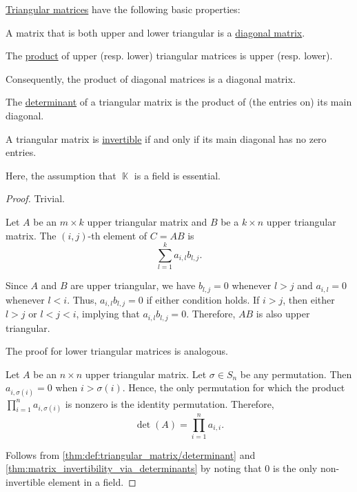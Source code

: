 \begin{proposition}\label{thm:def:triangular_matrix}
  \hyperref[def:triangular_matrix]{Triangular matrices} have the following basic properties:
  \begin{thmenum}
     A matrix that is both upper and lower triangular is a \hyperref[def:matrix_diagonal]{diagonal matrix}.

     The \hyperref[thm:matrix_algebra/matrix_multiplication]{product} of upper (resp. lower) triangular matrices is upper (resp. lower).

    Consequently, the product of diagonal matrices is a diagonal matrix.

     The \hyperref[thm:def:triangular_matrix/determinant]{determinant} of a triangular matrix is the product of (the entries on) its main diagonal.

     A triangular matrix is \hyperref[def:inverse_matrix]{invertible} if and only if its main diagonal has no zero entries.

    Here, the assumption that \( \BbbK \) is a field is essential.
  \end{thmenum}
\end{proposition}
\begin{proof}
   Trivial.

   Let \( A \) be an \( m \times k \) upper triangular matrix and \( B \) be a \( k \times n \) upper triangular matrix. The \( (i, j) \)-th element of \( C = AB \) is
  \begin{equation*}
    \sum_{l=1}^k a_{i,l} b_{l,j}.
  \end{equation*}

  Since \( A \) and \( B \) are upper triangular, we have \( b_{l,j} = 0 \) whenever \( l > j \) and \( a_{i,l} = 0 \) whenever \( l < i \). Thus, \( a_{i,l} b_{l,j} = 0 \) if either condition holds. If \( i > j \), then either \( l > j \) or \( l < j < i \), implying that \( a_{i,l} b_{l,j} = 0 \). Therefore, \( AB \) is also upper triangular.

  The proof for lower triangular matrices is analogous.

   Let \( A \) be an \( n \times n \) upper triangular matrix. Let \( \sigma \in S_n \) be any permutation. Then \( a_{i,\sigma(i)} = 0 \) when \( i > \sigma(i) \). Hence, the only permutation for which the product \( \prod_{i=1}^n a_{i,\sigma(i)} \) is nonzero is the identity permutation. Therefore,
  \begin{equation*}
    \det(A) = \prod_{i=1}^n a_{i,i}.
  \end{equation*}

   Follows from \cref{thm:def:triangular_matrix/determinant} and \cref{thm:matrix_invertibility_via_determinants} by noting that \( 0 \) is the only non-invertible element in a field.
\end{proof}

